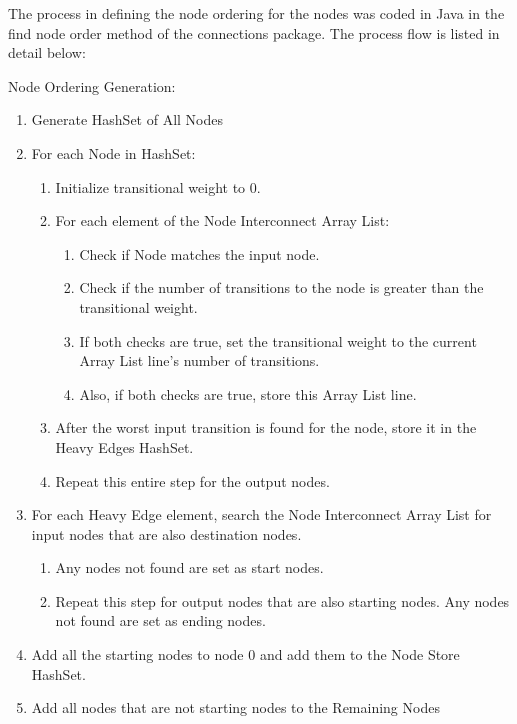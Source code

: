 The process in defining the node ordering for the nodes was coded in Java in the
find node order method of the connections package.  The process flow is listed
in detail below:

\begin{description}
    \item[Node Ordering Generation:]
\end{description}
 \begin{enumerate}
   \item Generate HashSet of All Nodes
   \item For each Node in HashSet:
   \begin{enumerate}
     \item Initialize transitional weight to 0.
     \item For each element of the Node Interconnect Array List:
     \begin{enumerate}
       \item Check if Node matches the input node.
       \item Check if the number of transitions to the node is greater than the
       transitional weight.
       \item If both checks are true, set the transitional weight to the current
       Array List line's number of transitions.
       \item Also, if both checks are true, store this Array List line.
     \end{enumerate}
     \item After the worst input transition is found for the node, store it in
     the Heavy Edges HashSet.
     \item Repeat this entire step for the output nodes.
   \end{enumerate}
   \item For each Heavy Edge element, search the Node Interconnect Array List
   for input nodes that are also destination nodes.
   \begin{enumerate}
     \item Any nodes not found are set as start nodes.
     \item Repeat this step for output nodes that are also starting nodes.  Any
     nodes not found are set as ending nodes.
   \end{enumerate}
   \item Add all the starting nodes to node 0 and add them to the Node Store
   HashSet.
   \item Add all nodes that are not starting nodes to the Remaining Nodes

\end{enumerate}
